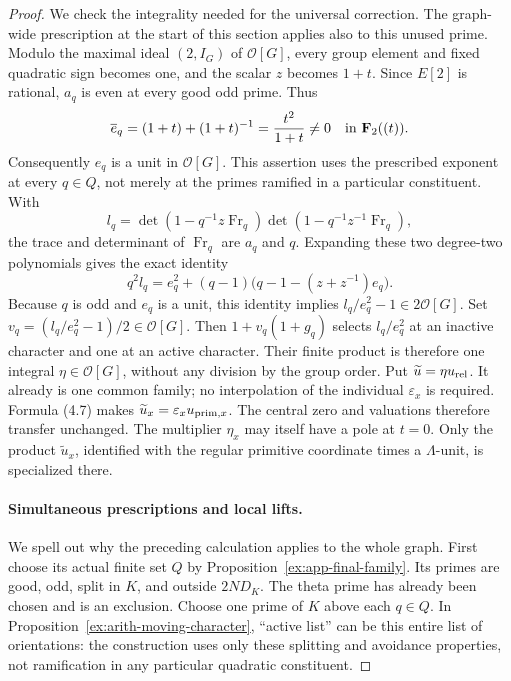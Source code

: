 \documentclass[11pt]{article}
\theoremstyle{definition}
\theoremstyle{remark}
\providecommand{\mathscr}[1]{\mathcal{#1}}
\begin{document}
\begin{proof}
We check the integrality needed for the universal correction.
The graph-wide prescription at the start of this section applies
also to this unused prime. Modulo the maximal ideal
$(2,I_G)$ of $\mathscr O[G]$, every group element and fixed quadratic
sign becomes one, and the scalar $z$ becomes $1+t$. Since $E[2]$
is rational, $a_q$ is even at every good odd prime. Thus
\[
 \overline e_q=(1+t)+(1+t)^{-1}=\frac{t^2}{1+t}
       \ne0\quad\hbox{in }\mathbf F_2((t)).
\]
Consequently $e_q$ is a unit in $\mathscr O[G]$. This assertion uses
the prescribed exponent at every $q\in Q$, not merely at the primes
ramified in a particular constituent. With
\[
 l_q=\det(1-q^{-1}z\operatorname{Fr}_q)
       \det(1-q^{-1}z^{-1}\operatorname{Fr}_q),
\]
the trace and determinant of $\operatorname{Fr}_q$ are $a_q$ and $q$.
Expanding these two degree-two polynomials gives the exact identity
\[
 q^2l_q=e_q^2+(q-1)\bigl(q-1-(z+z^{-1})e_q\bigr).
\]
Because $q$ is odd and $e_q$ is a unit, this identity implies
$l_q/e_q^2-1\in2\mathscr O[G]$. Set
$v_q=(l_q/e_q^2-1)/2\in\mathscr O[G]$.
Then $1+v_q(1+g_q)$ selects $l_q/e_q^2$ at an inactive character
and one at an active character. Their finite product is therefore
one integral $\eta\in\mathscr O[G]$, without any division by the
group order. Put $\widetilde u=\eta u_{\rm rel}$.
It already is one common family; no interpolation of the individual
$\varepsilon_x$ is required. Formula (4.7) makes
$\widetilde u_x=\varepsilon_xu_{{\rm prim},x}$.
The central zero and valuations therefore transfer unchanged.
The multiplier $\eta_x$ may itself have a pole at $t=0$.
Only the product $\widetilde u_x$, identified with the regular
primitive coordinate times a $\Lambda$-unit, is specialized there.
\paragraph{Simultaneous prescriptions and local lifts.}
We spell out why the preceding calculation applies to the whole
graph. First choose its actual finite set $Q$ by
Proposition~\ref{ex:app-final-family}. Its primes are good, odd,
split in $K$, and outside $2ND_K$. The theta prime has already
been chosen and is an exclusion. Choose one prime of $K$ above
each $q\in Q$. In Proposition~\ref{ex:arith-moving-character},
``active list'' can be this entire list of orientations: the
construction uses only these splitting and avoidance properties,
not ramification in any particular quadratic constituent.


\end{proof}
\end{document}

